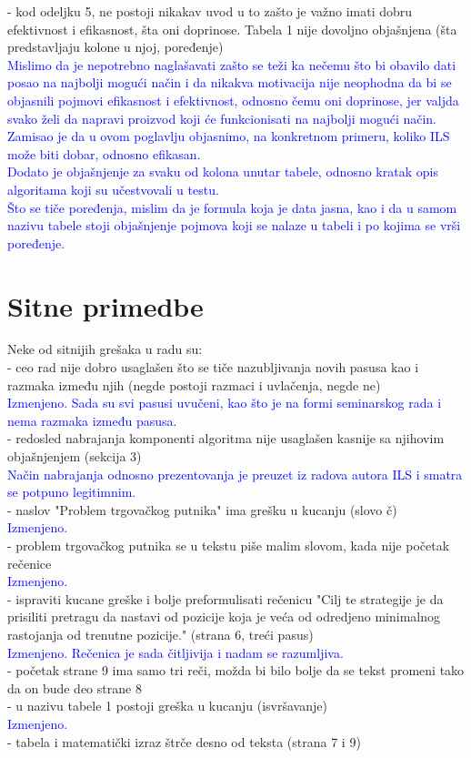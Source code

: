 \documentclass[a4paper]{report}
\newcommand{\odgovor}[1]{\textcolor{blue}{#1}}
\begin{document}
- kod odeljku 5, ne postoji nikakav uvod u to zašto je važno imati dobru efektivnost i efikasnost, šta oni doprinose. Tabela 1 nije dovoljno objašnjena (šta predstavljaju kolone u njoj, poređenje) \\
\odgovor{Mislimo da je nepotrebno naglašavati zašto se teži ka nečemu što bi obavilo dati posao na najbolji mogući način i da nikakva motivacija nije neophodna da bi se objasnili pojmovi efikasnost i efektivnost, odnosno čemu oni doprinose, jer valjda svako želi da napravi proizvod koji će funkcionisati na najbolji mogući način. Zamisao je da u ovom poglavlju objasnimo, na konkretnom primeru, koliko ILS može biti dobar, odnosno efikasan.\\
Dodato je objašnjenje za svaku od kolona unutar tabele, odnosno kratak opis algoritama koji su učestvovali u testu.\\
Što se tiče poređenja, mislim da je formula koja je data jasna, kao i da u samom nazivu tabele stoji objašnjenje pojmova koji se nalaze u tabeli i po kojima se vrši poređenje.\\}


\section{Sitne primedbe}

Neke od sitnijih grešaka u radu su: \\
- ceo rad nije dobro usaglašen što se tiče nazubljivanja novih pasusa kao i razmaka između njih (negde postoji razmaci i uvlačenja, negde ne)\\
\odgovor{Izmenjeno. Sada su svi pasusi uvučeni, kao što je na formi seminarskog rada i nema razmaka između pasusa.\\}
- redosled nabrajanja komponenti algoritma nije usaglašen kasnije sa njihovim objašnjenjem  (sekcija 3)\\
\odgovor{Način nabrajanja odnosno prezentovanja je preuzet iz radova autora ILS i smatra se potpuno legitimnim.\\}
- naslov "Problem trgovačkog putnika" ima grešku u kucanju (slovo č)\\
\odgovor{Izmenjeno.\\}
- problem trgovačkog putnika se u tekstu piše malim slovom, kada nije početak rečenice\\
\odgovor{Izmenjeno.\\}
- ispraviti kucane greške i bolje preformulisati rečenicu "Cilj te strategije je da prisiliti pretragu da nastavi od pozicije koja je veća od odredjeno minimalnog rastojanja od trenutne pozicije." (strana 6, treći pasus)\\
\odgovor{Izmenjeno. Rečenica je sada čitljivija i nadam se razumljiva.\\}
- početak strane 9 ima samo tri reči, možda bi bilo bolje da se tekst promeni tako da on bude deo strane 8\\
- u nazivu tabele 1 postoji greška u kucanju (isvršavanje)\\
\odgovor{Izmenjeno.\\}
- tabela i matematički izraz štrče desno od teksta (strana 7 i 9)
\end{document}

